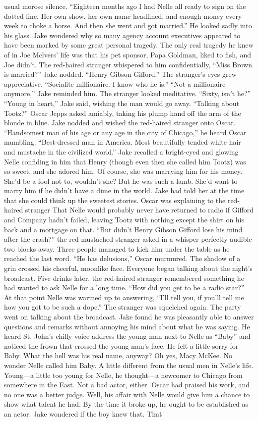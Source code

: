 \documentclass{novel}
\begin{document}
usual morose silence. “Eighteen months ago I had Nelle all ready to sign on the dotted line. Her own show, her own name headlined, and enough money every week to choke a horse. And then she went and got married.” He looked sadly into his glass. Jake wondered why so many agency account executives appeared to have been marked by some great personal tragedy. The only real tragedy he knew of in Joe Mclvers’ life was that his pet sponsor, Papa Goldman, liked to fish, and Joe didn’t. The red-haired stranger whispered to him confidentially, “Miss Brown is married?” Jake nodded. “Henry Gibson Gifford.” The stranger’s eyes grew appreciative. “Socialite millionaire. I know who he is.” “Not a millionaire anymore,” Jake reminded him. The stranger looked meditative. “Sixty, isn’t he?” “Young in heart,” Jake said, wishing the man would go away. “Talking about Tootz?” Oscar Jepps asked amiably, taking his plump hand off the arm of the blonde in blue. Jake nodded and wished the red-haired stranger onto Oscar. “Handsomest man of his age or any age in the city of Chicago,” he heard Oscar mumbling. “Best-dressed man in America. Most beautifully tended white hair and mustache in the civilized world.” Jake recalled a bright-eyed and glowing Nelle confiding in him that Henry (though even then she called him Tootz) was so sweet, and she adored him. Of course, she was marrying him for his money. She’d be a fool not to, wouldn’t she? But he was such a lamb. She’d want to marry him if he didn’t have a dime in the world. Jake had told her at the time that she could think up the sweetest stories. Oscar was explaining to the red-haired stranger That Nelle would probably never have returned to radio if Gifford and Company hadn’t failed, leaving Tootz with nothing except the shirt on his back and a mortgage on that. “But didn’t Henry Gibson Gifford lose his mind after the crash?” the red-mustached stranger asked in a whisper perfectly audible two blocks away. Three people managed to kick him under the table as he reached the last word. “He has delusions,” Oscar murmured. The shadow of a grin crossed his cheerful, moonlike face. Everyone began talking about the night’s broadcast. Five drinks later, the red-haired stranger remembered something he had wanted to ask Nelle for a long time. “How did you get to be a radio star?” At that point Nelle was warmed up to answering, “I’ll tell you, if you’ll tell me how you got to be such a dope.” The stranger was squelched again. The party went on talking about the broadcast. Jake found he was pleasantly able to answer questions and remarks without annoying his mind about what he was saying. He heard St. John’s chilly voice address the young man next to Nelle as “Baby” and noticed the frown that crossed the young man’s face. He felt a little sorry for Baby. What the hell was his real name, anyway? Oh yes, Macy McKee. No wonder Nelle called him Baby. A little different from the usual men in Nelle’s life. Young—a little too young for Nelle, he thought—a newcomer to Chicago from somewhere in the East. Not a bad actor, either. Oscar had praised his work, and no one was a better judge. Well, his affair with Nelle would give him a chance to show what talent he had. By the time it broke up, he ought to be established as an actor. Jake wondered if the boy knew that. That 
\end{document}
